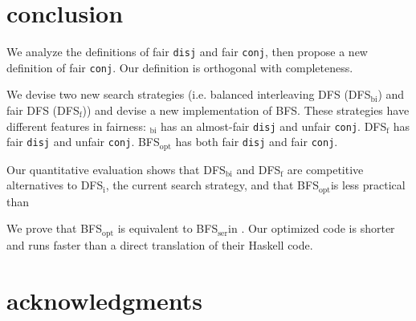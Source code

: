 \documentclass[format=acmlarge, review=true, authordraft=true]{acmart}
\newcommand{\conj}{\texttt{conj}}
\newcommand{\disj}{\texttt{disj}}
\newcommand{\BFSopt}[0]{BFS$_\textrm{opt}$}
\newcommand{\BFSser}[0]{BFS$_\textrm{ser}$}
\begin{document}
\section{conclusion}

We analyze the definitions of fair \disj{} and fair \conj{}, then propose a 
new definition of fair \conj{}. Our definition is orthogonal with completeness.

We devise two new search strategies (i.e. balanced interleaving DFS 
(DFS$_\textrm{bi}$) and fair DFS (DFS$_\textrm{f}$)) and devise a new 
implementation of BFS. These strategies have different features 
in fairness: $_\textrm{bi}$ has an almost-fair \disj{} and unfair \conj{}. 
DFS$_\textrm{f}$ has fair \disj{} and unfair \conj{}. \BFSopt{} has both fair
\disj{} and fair \conj{}.

Our quantitative evaluation shows that DFS$_\textrm{bi}$ and DFS$_\textrm{f}$ are competitive 
alternatives to DFS$_\textrm{i}$, the current search strategy, and that 
\BFSopt is less practical than 

We prove that \BFSopt{} is equivalent to \BFSser in \citet{seres1999algebra}. 
Our optimized code is shorter and runs faster than a direct translation 
of their Haskell code.

\section*{acknowledgments}



\end{document}
